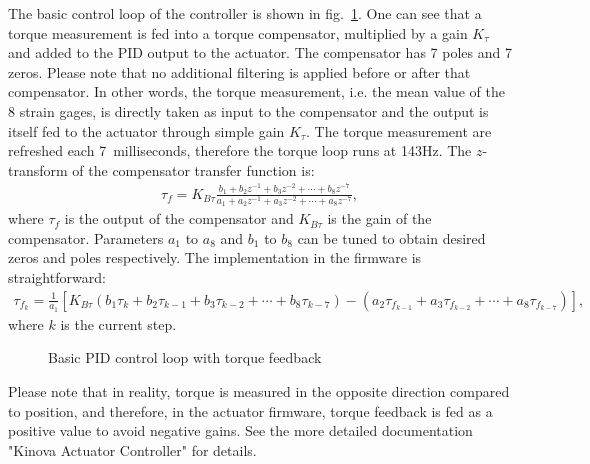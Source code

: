 The basic control loop of the controller is shown in fig.~\ref{fig:loop}. One can see that a torque measurement is fed into a torque compensator, multiplied by a gain $K_{\tau}$ and added to the PID output to the actuator. The compensator has 7 poles and 7 zeros. Please note that no additional filtering is applied before or after that compensator. In other words, the torque measurement, i.e. the mean value of the 8 strain gages, is directly taken as input to the compensator and the output is itself fed to the actuator through simple gain $K_\tau$. The torque measurement are refreshed each 7~milliseconds, therefore the torque loop runs at 143Hz. The $z$-transform of the compensator transfer function is:
\begin{align}
	\tau_f = K_{B\tau}\frac{b_1 + b_2z^{-1} + b_3z^{-2} + \cdots + b_8z^{-7}}{a_1 + a_2z^{-1} + a_3z^{-2} + \cdots + a_8z^{-7}}, \label{eqn:tf}
\end{align}
where $\tau_f$ is the output of the compensator and $K_{B\tau}$ is the gain of the compensator. Parameters $a_1$ to $a_8$ and $b_1$ to $b_8$ can be tuned to obtain desired zeros and poles respectively. The implementation in the firmware is straightforward:
\begin{align}
	\tau_{f_k} = \frac{1}{a_1}[K_{B\tau}(b_1\tau_k+b_2\tau_{k-1}+b_3\tau_{k-2}+\cdots+b_8\tau_{k-7})-(a_2\tau_{f_{k-1}}+a_3\tau_{f_{k-2}}+\cdots+a_8\tau_{f_{k-7}})] \label{eqn:firmware},
\end{align}
where $k$ is the current step.

	\begin{figure}
		\begin{center}
			\def\svgwidth{173mm}%
			
			\caption{Basic PID control loop with torque feedback}
			\label{fig:loop}
		\end{center}
	\end{figure}

Please note that in reality, torque is measured in the opposite direction compared to position, and therefore, in the actuator firmware, torque feedback is fed as a positive value to avoid negative gains. See the more detailed documentation "Kinova Actuator Controller" for details.
